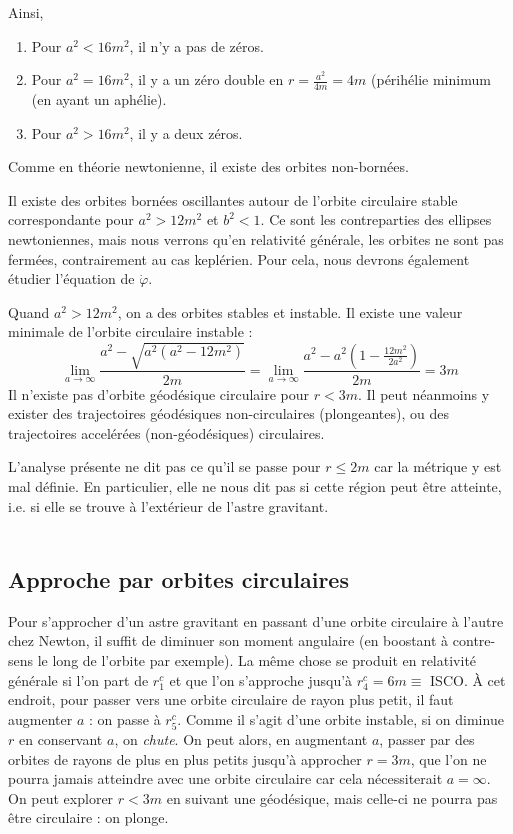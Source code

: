 Ainsi, 
\begin{enumerate}
    \item Pour $a^2<16m^2$, il n'y a pas de zéros.
    \item Pour $a^2 = 16m^2$, il y a un zéro double en $r = \frac{a^2}{4m} = 4m$ (périhélie minimum (en ayant un aphélie).
    \item Pour $a^2 > 16 m^2$, il y a deux zéros.
\end{enumerate}
\begin{rmk}
    Comme en théorie newtonienne, il existe des orbites non-bornées.
\end{rmk}
\begin{rmk}
    Il existe des orbites bornées oscillantes autour de l'orbite circulaire stable correspondante pour $a^2>12m^2$ et $b^2<1$. Ce sont les contreparties des ellipses newtoniennes, mais nous verrons qu'en relativité générale, les orbites ne sont pas fermées, contrairement au cas keplérien. Pour cela, nous devrons également étudier l'équation de $\dot{\varphi}$.
\end{rmk}
\begin{rmk}
    Quand $a^2>12m^2$, on a des orbites stables et instable. Il existe une valeur minimale de l'orbite circulaire instable :
    \begin{equation}
        \lim_{a\to \infty} \frac{a^2 - \sqrt{a^2(a^2-12m^2)}}{2m} =\lim_{a\to \infty} \frac{a^2 - a^2(1-\frac{12m^2}{2a^2})}{2m} = 3m
    \end{equation}
    Il n'existe pas d'orbite géodésique circulaire pour $r<3m$. Il peut néanmoins y exister des trajectoires géodésiques non-circulaires (plongeantes), ou des trajectoires accelérées (non-géodésiques) circulaires.
\end{rmk}
L'analyse présente ne dit pas ce qu'il se passe pour $r \leq 2m$ car la métrique y est mal définie. En particulier, elle ne nous dit pas si cette région peut être atteinte, i.e. si elle se trouve à l'extérieur de l'astre gravitant.\\
\\
\subsection{Approche par orbites circulaires}
Pour s'approcher d'un astre gravitant en passant d'une orbite circulaire à l'autre chez Newton, il suffit de diminuer son moment angulaire (en boostant à contre-sens le long de l'orbite par exemple). La même chose se produit en relativité générale si l'on part de $r^c_1$ et que l'on s'approche jusqu'à $r^c_4 = 6m \equiv$ ISCO. À cet endroit, pour passer vers une orbite circulaire de rayon plus petit, il faut augmenter $a$ : on passe à $r^c_5$. Comme il s'agit d'une orbite instable, si on diminue $r$ en conservant $a$, on \emph{chute}. On peut alors, en augmentant $a$, passer par des orbites de rayons de plus en plus petits jusqu'à approcher $r=3m$, que l'on ne pourra jamais atteindre avec une orbite circulaire car cela nécessiterait $a = \infty$. On peut explorer $r<3m$ en suivant une géodésique, mais celle-ci ne pourra pas être circulaire : on plonge.

